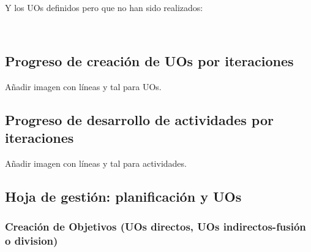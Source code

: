 \noindent
{}\\

\vspace{0.1cm}

Y los UOs definidos pero que no han sido realizados:\\

\vspace{0.1cm}

\noindent
{}\\

\vspace{0.1cm}

\subsection{Progreso de creación de UOs por iteraciones}
\label{dgp:uos-iteraciones-creacion}

Añadir imagen con líneas y tal para UOs.\\

\subsection{Progreso de desarrollo de actividades por iteraciones}
\label{dgp:uos-iteraciones-actividades}

Añadir imagen con líneas y tal para actividades.\\

\subsection{Hoja de gestión: planificación y UOs}
\label{dgp:hoja-de-gestion}

\subsubsection{Creación de Objetivos (UOs directos, UOs indirectos-fusión o division)}
\label{dgp:hoja-de-gestion:a}

